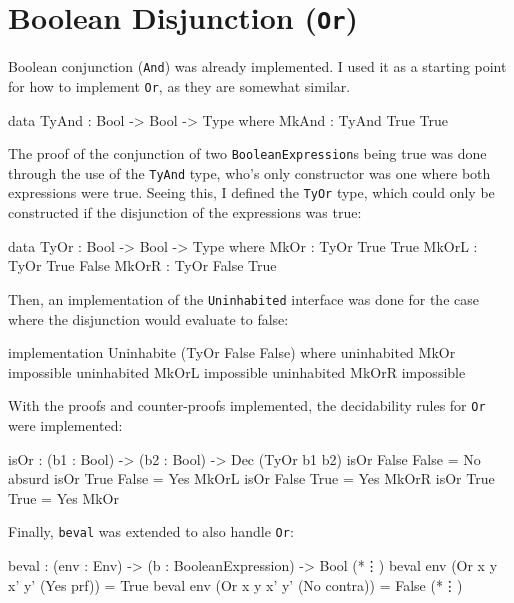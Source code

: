 \section{Boolean Disjunction (\texttt{Or})}
    Boolean conjunction (\texttt{And}) was already implemented. I used it as a starting point for how to implement \texttt{Or}, as they are somewhat similar.
    \begin{code}[caption={The proof type for \texttt{And}}]
        data TyAnd : Bool -> Bool -> Type where
            MkAnd : TyAnd True True
    \end{code}
    The proof of the conjunction of two \texttt{BooleanExpression}s being true was done through the use of the \texttt{TyAnd} type, who's only constructor was one where both expressions were true. Seeing this, I defined the \texttt{TyOr} type, which could only be constructed if the disjunction of the expressions was true:
    \begin{code}[caption={The proof type for \texttt{Or}}]
        data TyOr : Bool -> Bool -> Type where
            MkOr  : TyOr True True
            MkOrL : TyOr True False
            MkOrR : TyOr False True
    \end{code}
    Then, an implementation of the \texttt{Uninhabited} interface was done for the case where the disjunction would evaluate to false:
    \begin{code}[caption={\texttt{Or False False} is impossible}]
        implementation Uninhabite (TyOr False False) where
            uninhabited MkOr  impossible
            uninhabited MkOrL impossible
            uninhabited MkOrR impossible
    \end{code}
    With the proofs and counter-proofs implemented, the decidability rules for \texttt{Or} were implemented:
    \begin{code}[caption={Decidability rules for \texttt{Or}}]
        isOr : (b1 : Bool) -> (b2 : Bool) -> Dec (TyOr b1 b2)
        isOr False False = No absurd
        isOr True False  = Yes MkOrL
        isOr False True  = Yes MkOrR
        isOr True True   = Yes MkOr
    \end{code}
    Finally, \texttt{beval} was extended to also handle \texttt{Or}:
    \begin{code}[caption={\texttt{beval} for \texttt{Or}}, escapeinside={(*}{*)}]
        beval : (env : Env) -> (b : BooleanExpression) -> Bool
            (*\vdots*)
        beval env (Or x y x' y' (Yes prf))   = True
        beval env (Or x y x' y' (No contra)) = False
            (*\vdots*)
    \end{code}
    
